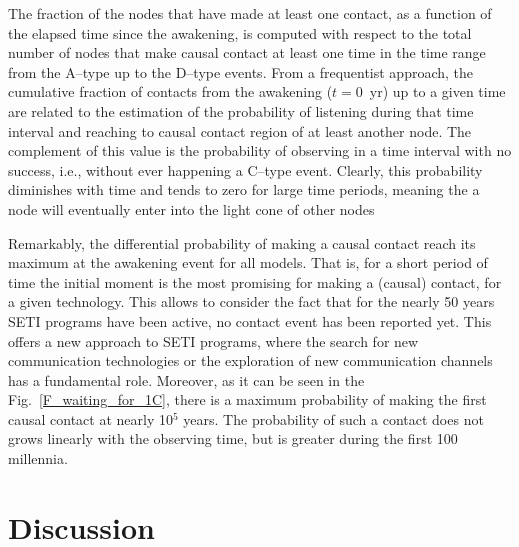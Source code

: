 \documentclass[crop]{CSLB}
\newcommand{\ceti}{node}
\newcommand{\cetis}{nodes}
\begin{document}
The fraction of the \cetis{} that have made at least one contact, as a
function of the elapsed time since the awakening, is computed with
respect to the total number of nodes that make causal contact at least
one time in the time range from the A--type up to the D--type events.
%
From a frequentist approach, the cumulative fraction of contacts from
the awakening ($t=$0~yr) up to a given time are related to the
estimation of the probability of listening during that time interval
and reaching to causal contact region of at least another node.
%
The complement of this value is the probability of observing in a time
interval with no success, i.e., without ever happening a C--type
event.
%
Clearly, this probability diminishes with time and tends to zero for
large time periods, meaning the a \ceti{} will eventually enter into
the light cone of other \cetis{}


Remarkably, the differential probability of making a causal contact
reach its maximum at the awakening event for all models.
%
That is, for a short period of time the initial moment is the most
promising for making a (causal) contact, for a given technology.
%
This allows to consider the fact that for the nearly 50 years SETI
programs have been active, no contact event has been reported yet.
%
This offers a new approach to SETI programs, where the search for new
communication technologies or the exploration of new communication
channels has a fundamental role.
%
Moreover, as it can be seen in the Fig.~\ref{F_waiting_for_1C}, there
is a maximum probability of making the first causal contact at nearly
10$^5$ years.
%
The probability of such a contact does not grows linearly with the
observing time, but is greater during the first 100 millennia.


\section{Discussion}\label{S_discussion}
\end{document}
